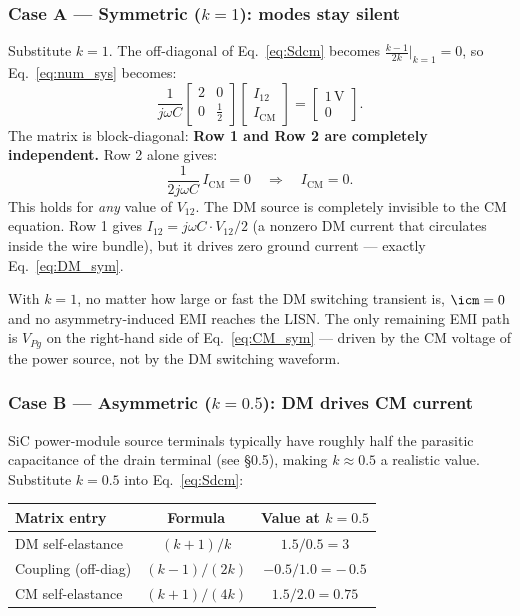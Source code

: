 \subsubsection*{Case A — Symmetric ($k = 1$): modes stay silent}

Substitute $k = 1$.  The off-diagonal of Eq.~\eqref{eq:Sdcm}
becomes $\tfrac{k-1}{2k}\big|_{k=1} = 0$, so
Eq.~\eqref{eq:num_sys} becomes:
\[
\frac{1}{j\omega C}
\begin{bmatrix} 2 & 0 \\ 0 & \tfrac{1}{2} \end{bmatrix}
\begin{bmatrix} I_{12} \\ I_{\mathrm{CM}} \end{bmatrix}
=
\begin{bmatrix} 1\,\mathrm{V} \\ 0 \end{bmatrix}.
\]
The matrix is block-diagonal: \textbf{Row 1 and Row 2 are
completely independent.}  Row 2 alone gives:
\[
    \frac{1}{2j\omega C}\,I_{\mathrm{CM}} = 0
    \quad\Longrightarrow\quad
    \boxed{I_{\mathrm{CM}} = 0.}
\]
This holds for \emph{any} value of $V_{12}$.  The DM source is
completely invisible to the CM equation.  Row 1 gives
$I_{12} = j\omega C \cdot V_{12}/2$ (a nonzero DM current that
circulates inside the wire bundle), but it drives zero ground
current — exactly Eq.~\eqref{eq:DM_sym}.

\begin{statebox}
With $k = 1$, no matter how large or fast the DM switching
transient is, $\icm = 0$ and no asymmetry-induced EMI reaches the
LISN.  The only remaining EMI path is $V_{Pg}$ on the right-hand
side of Eq.~\eqref{eq:CM_sym} — driven by the CM voltage of the
power source, not by the DM switching waveform.
\end{statebox}

\subsubsection*{Case B — Asymmetric ($k = 0.5$): DM drives CM current}

SiC power-module source terminals typically have roughly half the
parasitic capacitance of the drain terminal (see \S0.5), making
$k \approx 0.5$ a realistic value.
Substitute $k = 0.5$ into Eq.~\eqref{eq:Sdcm}:

\begin{center}
\renewcommand{\arraystretch}{1.5}
\begin{tabular}{lcc}
\toprule
Matrix entry & Formula & Value at $k = 0.5$ \\
\midrule
DM self-elastance  & $(k+1)/k$    & $1.5/0.5 = 3$ \\
Coupling (off-diag) & $(k-1)/(2k)$ & $-0.5/1.0 = -\,0.5$ \\
CM self-elastance  & $(k+1)/(4k)$ & $1.5/2.0 = 0.75$ \\
\bottomrule
\end{tabular}
\end{center}


